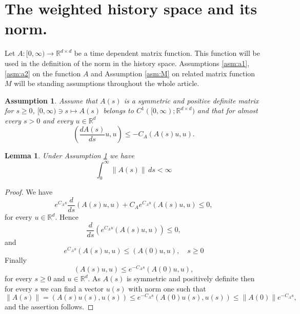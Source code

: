 \documentclass[11pt, leqno]{amsart}
\newtheorem{lem}[thm]{Lemma}
\newtheorem{asm}[thm]{Assumption}
\theoremstyle{definition}
\def\R{\mathbb{R}}
\begin{document}
\section{The weighted history space and its norm.}
Let $A: [0,\infty) \to \R^{d\times d}$ be a time dependent matrix function. This function will be used in the definition of the norm in the history space. Assumptions \ref{asm:a1}, \ref{asm:a2} on the function $A$ and Assumption \ref{asm:M} on related matrix function $M$ will be standing assumptions throughout the whole article.
\begin{asm}\label{asm1}\label{asm:a1}
	Assume that $A(s)$ is a symmetric and positive definite matrix for $s\geq 0$, $[0,\infty) \ni s\mapsto A(s)$ belongs to $C^1([0,\infty);\R^{d\times d})$ and that for almost every $s>0$ and every $u\in \R^d$
	\begin{equation}\label{eq:diffA}
	\left(\frac{dA(s)}{ds}u,u\right) \leq -C_A(A(s)u,u).
	\end{equation}
\end{asm}
\begin{lem}
	Under Assumption \ref{asm1} we have
	$$
	\int_0^\infty \|A(s)\|\, ds < \infty
	$$
\end{lem}
\begin{proof}
	We have
	$$
	 e^{C_As} \frac{d}{ds} (A(s)u,u) + C_Ae^{C_As}(A(s)u,u) \leq 0,
	$$
	for every $u\in \R^d$. Hence
	$$
	\frac{d}{ds} (e^{C_As}(A(s)u,u)) \leq 0,
	$$
	and
	$$
	e^{C_As}(A(s)u,u) \leq (A(0)u,u), \quad s \geq 0
	$$
	Finally
	$$
	(A(s)u,u) \leq e^{-C_As} (A(0)u,u),
	$$
	for every $s\geq 0$ and $u\in \R^d$.
	As $A(s)$ is symmetric and positively definite then for every $s$ we can find a vector $u(s)$ with norm one such that
	$$
	\|A(s)\| = (A(s)u(s),u(s)) \leq e^{-C_As}(A(0)u(s),u(s)) \leq \|A(0)\| e^{-C_As},
	$$
	and the assertion follows.
\end{proof}
\end{document}
